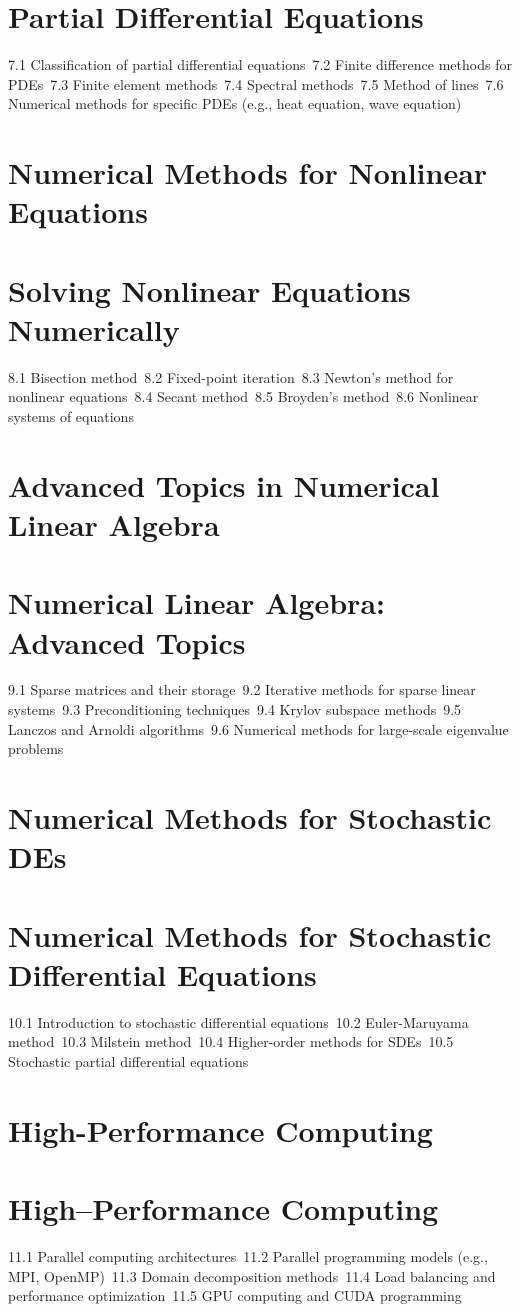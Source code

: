 \section{Partial Differential Equations}
7.1 Classification of partial differential equations\
7.2 Finite difference methods for PDEs\
7.3 Finite element methods\
7.4 Spectral methods\
7.5 Method of lines\
7.6 Numerical methods for specific PDEs (e.g., heat equation, wave equation)\
\section{Numerical Methods for Nonlinear Equations}
\section{Solving Nonlinear Equations Numerically}
8.1 Bisection method\
8.2 Fixed-point iteration\
8.3 Newton's method for nonlinear equations\
8.4 Secant method\
8.5 Broyden's method\
8.6 Nonlinear systems of equations\
\section{Advanced Topics in Numerical Linear Algebra}
\section{Numerical Linear Algebra: Advanced Topics}
9.1 Sparse matrices and their storage\
9.2 Iterative methods for sparse linear systems\
9.3 Preconditioning techniques\
9.4 Krylov subspace methods\
9.5 Lanczos and Arnoldi algorithms\
9.6 Numerical methods for large-scale eigenvalue problems\
\section{Numerical Methods for Stochastic DEs}
\section{Numerical Methods for Stochastic Differential Equations}
10.1 Introduction to stochastic differential equations\
10.2 Euler-Maruyama method\
10.3 Milstein method\
10.4 Higher-order methods for SDEs\
10.5 Stochastic partial differential equations\
\section{High-Performance Computing}
\section{High–Performance Computing}
11.1 Parallel computing architectures\
11.2 Parallel programming models (e.g., MPI, OpenMP)\
11.3 Domain decomposition methods\
11.4 Load balancing and performance optimization\
11.5 GPU computing and CUDA programming\
